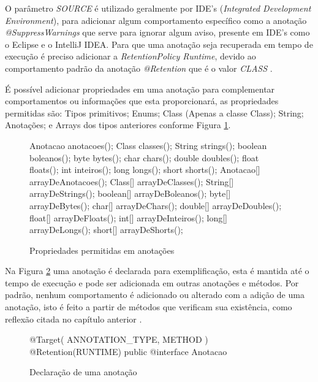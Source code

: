 \par O parâmetro \textit{SOURCE} é utilizado geralmente por IDE's (\textit{Integrated Development Environment}), para adicionar algum comportamento específico como a anotação \textit{@SuppressWarnings} que serve para ignorar algum aviso, presente em IDE's como o Eclipse e o IntelliJ IDEA. Para que uma anotação seja recuperada em tempo de execução é preciso adicionar a \textit{RetentionPolicy Runtime}, devido ao comportamento padrão da anotação \textit{@Retention} que é o valor \textit{CLASS} \cite{joy2000java}.

\par É possível adicionar propriedades em uma anotação para complementar comportamentos ou informações que esta proporcionará, as propriedades permitidas são: Tipos primitivos; Enums; Class (Apenas a classe Class); String; Anotações; e Arrays dos tipos anteriores conforme Figura \ref{fig:propriedades-anotacoes}.

\begin{figure}[H]
    \centering
    \begin{java}
Anotacao anotacoes();
Class classes();
String strings();
boolean boleanos();
byte bytes();
char chars();
double doubles();
float floats();
int inteiros();
long longs();	
short shorts();
Anotacao[] arrayDeAnotacoes();
Class[] arrayDeClasses();
String[] arrayDeStrings();
boolean[] arrayDeBoleanos();
byte[] arrayDeBytes();
char[] arrayDeChars();
double[] arrayDeDoubles();
float[] arrayDeFloats();
int[] arrayDeInteiros();
long[] arrayDeLongs();	
short[] arrayDeShorts();
    \end{java}
    \caption{Propriedades permitidas em anotações}
    \label{fig:propriedades-anotacoes}
\end{figure}

\par Na Figura \ref{fig:declaracao-anotacao} uma anotação é declarada para exemplificação, esta é mantida até o tempo de execução e pode ser adicionada em outras anotações e métodos. Por padrão, nenhum comportamento é adicionado ou alterado com a adição de uma anotação, isto é feito a partir de métodos que verificam sua existência, como reflexão citada no capítulo anterior \cite{bloch2004jsr}. 

\begin{figure}[H]
    \centering
    \begin{java}
@Target({ ANNOTATION_TYPE, METHOD })
@Retention(RUNTIME)
public @interface Anotacao {
}
    \end{java}
    \caption{Declaração de uma anotação}
    \label{fig:declaracao-anotacao}
\end{figure}

